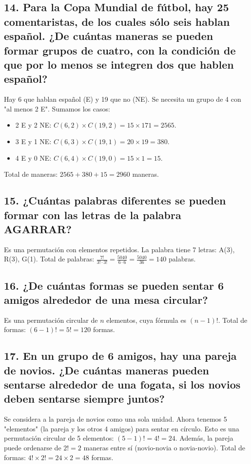 \documentclass[11pt]{article}
\begin{document}
    \subsection*{14. Para la Copa Mundial de fútbol, hay 25 comentaristas, de los cuales sólo seis hablan español. ¿De cuántas maneras se pueden formar grupos de cuatro, con la condición de que por lo menos se integren dos que hablen español?}
    Hay 6 que hablan español (E) y 19 que no (NE). Se necesita un grupo de 4 con "al menos 2 E". Sumamos los casos:
    \begin{itemize}
        \item 2 E y 2 NE: $C(6,2) \times C(19,2) = 15 \times 171 = 2565$.
        \item 3 E y 1 NE: $C(6,3) \times C(19,1) = 20 \times 19 = 380$.
        \item 4 E y 0 NE: $C(6,4) \times C(19,0) = 15 \times 1 = 15$.
    \end{itemize}
    Total de maneras: $2565 + 380 + 15 = 2960$ maneras.

    \subsection*{15. ¿Cuántas palabras diferentes se pueden formar con las letras de la palabra AGARRAR?}
    Es una permutación con elementos repetidos. La palabra tiene 7 letras: A(3), R(3), G(1).
    Total de palabras: $\frac{7!}{3! \cdot 3!} = \frac{5040}{6 \cdot 6} = \frac{5040}{36} = 140$ palabras.

    \subsection*{16. ¿De cuántas formas se pueden sentar 6 amigos alrededor de una mesa circular?}
    Es una permutación circular de $n$ elementos, cuya fórmula es $(n-1)!$.
    Total de formas: $(6-1)! = 5! = 120$ formas.

    \subsection*{17. En un grupo de 6 amigos, hay una pareja de novios. ¿De cuántas maneras pueden sentarse alrededor de una fogata, si los novios deben sentarse siempre juntos?}
    Se considera a la pareja de novios como una sola unidad. Ahora tenemos 5 "elementos" (la pareja y los otros 4 amigos) para sentar en círculo. Esto es una permutación circular de 5 elementos: $(5-1)! = 4! = 24$.
    Además, la pareja puede ordenarse de $2! = 2$ maneras entre sí (novio-novia o novia-novio).
    Total de formas: $4! \times 2! = 24 \times 2 = 48$ formas.
    
\end{document}

